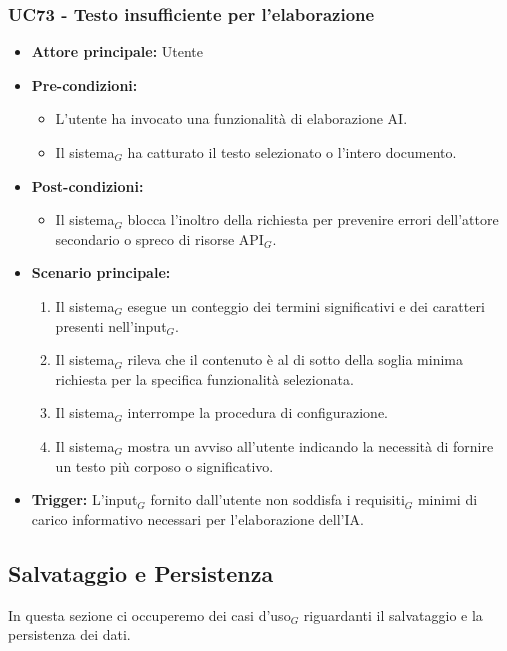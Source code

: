 \documentclass[a4paper, 10pt]{article}
\begin{document}
\subsubsection{UC73 - Testo insufficiente per l'elaborazione}
\hypertarget{uc:73}{}
\begin{itemize}
    \item \textbf{Attore principale:} Utente
    \item \textbf{Pre-condizioni:} 
        \begin{itemize}
            \item L'utente ha invocato una funzionalità di elaborazione AI.
            \item Il sistema$_G$ ha catturato il testo selezionato o l'intero documento.
        \end{itemize}
    \item \textbf{Post-condizioni:} 
        \begin{itemize}
            \item Il sistema$_G$ blocca l'inoltro della richiesta per prevenire errori dell'attore secondario o spreco di risorse API$_G$.
        \end{itemize}
    \item \textbf{Scenario principale:}
        \begin{enumerate}
            \item Il sistema$_G$ esegue un conteggio dei termini significativi e dei caratteri presenti nell'input$_G$.
            \item Il sistema$_G$ rileva che il contenuto è al di sotto della soglia minima richiesta per la specifica funzionalità selezionata.
            \item Il sistema$_G$ interrompe la procedura di configurazione.
            \item Il sistema$_G$ mostra un avviso all'utente indicando la necessità di fornire un testo più corposo o significativo.
        \end{enumerate}
    \item \textbf{Trigger:} L'input$_G$ fornito dall'utente non soddisfa i requisiti$_G$ minimi di carico informativo necessari per l'elaborazione dell'IA.
\end{itemize}

\newpage 
\subsection{Salvataggio e Persistenza}
In questa sezione ci occuperemo dei casi d'uso$_G$ riguardanti il salvataggio e la persistenza dei dati.
\end{document}
